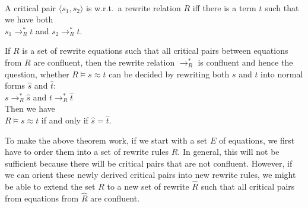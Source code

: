 \begin{Definition} \hspace*{\fill} \\
  A critical pair $\langle s_1, s_2\rangle$ is  w.r.t.~a rewrite relation $R$ iff there is a term
  $t$ such that we have both
  \\[0.2cm]
  \hspace*{1.3cm}
  $s_1 \rightarrow^*_R t$ \quad and \quad   $s_2 \rightarrow^*_R t$.  
\end{Definition}

\begin{Theorem}
  If $R$ is a set of rewrite equations such that all critical pairs between equations from $R$ are confluent,
  then the rewrite relation $\rightarrow^*_R$ is confluent and hence the question, whether $R \models s \approx t$
  can be decided by rewriting both $s$ and $t$ into normal forms $\widehat{s}$ and $\widehat{t}$:
  \\[0.2cm]
  \hspace*{1.3cm}
  $s \rightarrow^*_R \widehat{s}$ \quad and \quad  $t \rightarrow^*_R \widehat{t}$ 
  \\[0.2cm]
  Then we have
  \\[0.2cm]
  \hspace*{1.3cm}
  $R \models s \approx t$ \quad if and only if \quad $\widehat{s} = \widehat{t}$.
\end{Theorem}

\noindent
To make the above theorem work, if we start with a set $E$ of equations, we first have to order them into a set
of rewrite rules $R$.  In general, this will not be sufficient because there will be critical pairs that are
not confluent. However, if we can orient these newly derived critical pairs into new rewrite rules, we might be
able to extend the set $R$ to a new set of rewrite $\widehat{R}$ such that all critical pairs from equations
from $\widehat{R}$ are confluent.
\vspace*{0.2cm}

